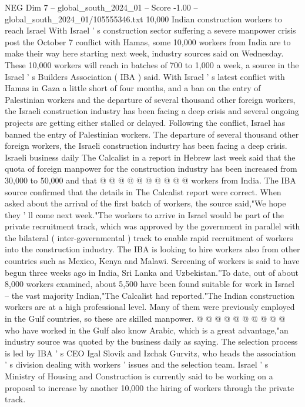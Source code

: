 \begin{textsample}{NEG Dim 7 – global\_south\_2024\_01 – Score -1.00 – global\_south\_2024\_01/105555346.txt}  \label{ex:f7_neg_142}
10,000 Indian construction workers to reach Israel With Israel ' s construction sector suffering a severe manpower crisis post the October 7 conflict with Hamas, some 10,000 workers from India are to make their way here starting next week, industry sources said on Wednesday.
These 10,000 workers will reach in batches of 700 to 1,000 a week, a source in the Israel ' s Builders Association ( IBA ) said.
With Israel ' s latest conflict with Hamas in Gaza a little short of four months, and a ban on the entry of Palestinian workers and the departure of several thousand other foreign workers, the Israeli construction industry has been facing a deep crisis and several ongoing projects are getting either stalled or delayed.
Following the conflict, Israel has banned the entry of Palestinian workers.
The departure of several thousand other foreign workers, the Israeli construction industry has been facing a deep crisis.
Israeli business daily The Calcalist in a report in Hebrew last week said that the quota of foreign manpower for the construction industry has been increased from 30,000 to 50,000 and that @ @ @ @ @ @ @ @ @ @ workers from India.
The IBA source confirmed that the details in The Calcalist report were correct.
When asked about the arrival of the first batch of workers, the source said,"We hope they ' ll come next week."The workers to arrive in Israel would be part of the private recruitment track, which was approved by the government in parallel with the bilateral ( inter-governmental ) track to enable rapid recruitment of workers into the construction industry.
The IBA is looking to hire workers also from other countries such as Mexico, Kenya and Malawi.
Screening of workers is said to have begun three weeks ago in India, Sri Lanka and Uzbekistan."To date, out of about 8,000 workers examined, about 5,500 have been found suitable for work in Israel -- the vast majority Indian,"The Calcalist had reported."The Indian construction workers are at a high professional level.
Many of them were previously employed in the Gulf countries, so these are skilled manpower. @ @ @ @ @ @ @ @ @ @ who have worked in the Gulf also know Arabic, which is a great advantage,"an industry source was quoted by the business daily as saying.
The selection process is led by IBA ' s CEO Igal Slovik and Izchak Gurvitz, who heads the association ' s division dealing with workers ' issues and the selection team.
Israel ' s Ministry of Housing and Construction is currently said to be working on a proposal to increase by another 10,000 the hiring of workers through the private track.

\end{textsample}
